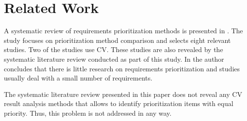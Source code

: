 \section{Related Work\label{relatedwork}}

A systematic review of requirements prioritization methods is presented in \cite{Khan2006}. The study focuses on prioritization method comparison and selects eight relevant studies. Two of the studies use CV. These studies are also revealed by the systematic literature review conducted as part of this study. In \cite{Khan2006} the author concludes that there is little research on requirements prioritization and studies usually deal with a small number of requirements.

The systematic literature review presented in this paper does not reveal any CV result analysis methods that allows to identify prioritization items with equal priority. Thus, this problem is not addressed in any way.

